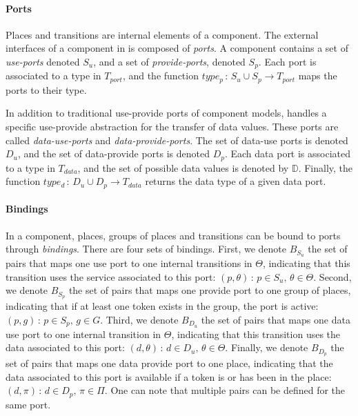 \paragraph{Ports}{

Places and transitions are internal elements of a \mad component.
The external interfaces of a component in \mad is
composed of \emph{ports}. A component contains a set of \emph{use-ports}
denoted $S_{u}$, and a set of \emph{provide-ports}, denoted
$S_{p}$. Each port is associated to a type in $T_{port}$, and the
function $type_{p}\,:\,S_{u}\cup S_{p}\rightarrow T_{port}$ maps the ports
to their type. 

In addition to traditional use-provide ports of component models,
\mad handles a specific use-provide abstraction for the
transfer of data values. These ports are called \emph{data-use-ports}
and \emph{data-provide-ports}. The set of data-use ports is denoted
$D_{u}$, and the set of data-provide ports is denoted
$D_{p}$. Each data port is associated to a type in $T_{data}$,
and the set of possible data values is denoted
by $\mathbb{D}$. Finally, the function $type_{d}\,:\,D_{u}\cup
D_{p}\rightarrow T_{data}$ returns the data type of a given data port.
  
}

\paragraph{Bindings}{

  In a \mad component, places, groups of places and transitions can be
  bound to ports through \emph{bindings}. There are four sets of
  bindings.  First, we denote $B_{S_{u}}$ the set of pairs that maps
  one use port to one internal transitions in $\Theta$, indicating
  that this transition uses the service associated to this port:
  $\left(p,\theta\right)\,:\,p\in S_{u},\,\theta\in\Theta$. Second, we
  denote $B_{S_{p}}$ the set of pairs that maps one provide port to
  one group of places, indicating that if at least one token exists in
  the group, the port is active:
  $\left(p,g\right)\,:\,p\in S_{p},\,g\in G$. Third, we denote
  $B_{D_{u}}$ the set of pairs that maps one data use port to one
  internal transition in $\Theta$, indicating that this transition
  uses the data associated to this port:
  $\left(d,\theta\right)\,:\,d\in D_{u},\,\theta\in\Theta$. Finally,
  we denote $B_{D_{p}}$ the set of pairs that maps one data provide
  port to one place, indicating that the data associated to this port
  is available if a token is or has been in the place:
  $\left(d,\pi\right)\,:\,d\in D_{p},\,\pi\in \Pi$. One can note that
  multiple pairs can be defined for the same port.}

